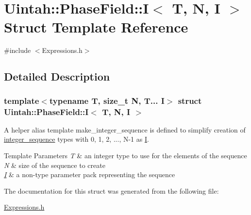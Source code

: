 \hypertarget{structUintah_1_1PhaseField_1_1I}{}\section{Uintah\+:\+:Phase\+Field\+:\+:I$<$ T, N, I $>$ Struct Template Reference}
\label{structUintah_1_1PhaseField_1_1I}


{\ttfamily \#include $<$Expressions.\+h$>$}



\subsection{Detailed Description}
\subsubsection*{template$<$typename T, size\+\_\+t N, T... I$>$\newline
struct Uintah\+::\+Phase\+Field\+::\+I$<$ T, N, I $>$}

A helper alias template make\+\_\+integer\+\_\+sequence is defined to simplify creation of \hyperlink{structUintah_1_1PhaseField_1_1integer__sequence}{integer\+\_\+sequence} types with 0, 1, 2, ..., N-\/1 as \hyperlink{structUintah_1_1PhaseField_1_1I}{I}.


\begin{DoxyTemplParams}{Template Parameters}
{\em T} & an integer type to use for the elements of the sequence \\
\hline
{\em N} & size of the sequence to create \\
\hline
{\em \hyperlink{structUintah_1_1PhaseField_1_1I}{I}} & a non-\/type parameter pack representing the sequence \\
\hline
\end{DoxyTemplParams}


The documentation for this struct was generated from the following file\+:\begin{DoxyCompactItemize}
\item 
\hyperlink{Expressions_8h}{Expressions.\+h}\end{DoxyCompactItemize}
